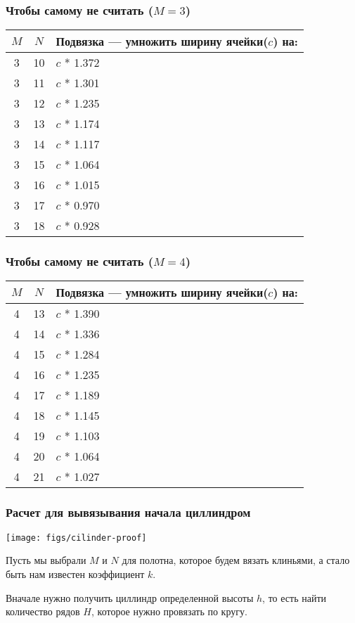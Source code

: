 \begin{frame}
    \frametitle{Чтобы самому не считать ($M=3$)}
	
	\begin{center}	
		\begin{tabular}{c|c|l}
			\hline\hline
			$M$ & $N$ &Подвязка --- умножить ширину ячейки($c$) на: \\ 
			\hline\hline
			3 & 10 & $c$ * 1.372 \\
			3 & 11 & $c$ * 1.301 \\
			3 & 12 & $c$ * 1.235 \\
			3 & 13 & $c$ * 1.174 \\
			3 & 14 & $c$ * 1.117 \\
			3 & 15 & $c$ * 1.064 \\
			3 & 16 & $c$ * 1.015 \\
			3 & 17 & $c$ * 0.970 \\
			3 & 18 & $c$ * 0.928 \\
		\hline		
		\end{tabular}
	\end{center}	
\end{frame}

\begin{frame}
    \frametitle{Чтобы самому не считать ($M=4$)}
	
	\begin{center}	
		\begin{tabular}{c|c|l}
			\hline\hline
			$M$ & $N$ &Подвязка --- умножить ширину ячейки($c$) на: \\ 
			\hline\hline
			4 & 13 & $c$ * 1.390 \\ 
			4 & 14 & $c$ * 1.336 \\ 
			4 & 15 & $c$ * 1.284 \\ 
			4 & 16 & $c$ * 1.235 \\ 
			4 & 17 & $c$ * 1.189 \\ 
			4 & 18 & $c$ * 1.145 \\ 
			4 & 19 & $c$ * 1.103 \\ 
			4 & 20 & $c$ * 1.064 \\ 
			4 & 21 & $c$ * 1.027 \\
			\hline		
		\end{tabular}
	\end{center}	
\end{frame}

\begin{frame}
    \frametitle{Расчет для вывязывания начала циллиндром}

    \begin{center}
        \texttt{[image: figs/cilinder-proof]}
    \end{center}
	
	Пусть мы выбрали $M$ и $N$ для полотна, которое будем вязать клиньями, а стало быть нам известен коэффициент $k$.

	Вначале нужно получить циллиндр определенной высоты $h$, то есть найти количество рядов $H$, которое нужно провязать по кругу. 
\end{frame}

